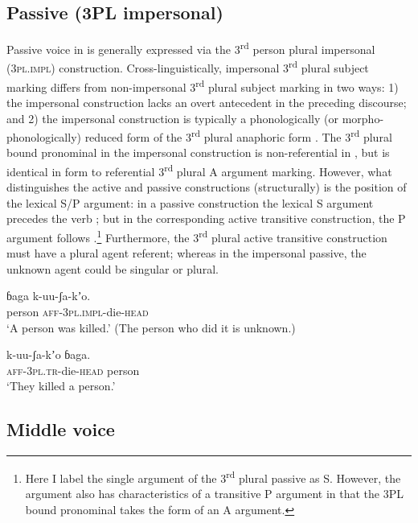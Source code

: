 \documentclass[output=paper]{langsci/langscibook}
\begin{document}
\subsection{Passive (3PL impersonal)}\label{sec:ahlandc:6.1}

Passive voice in  is generally expressed via the 3\textsuperscript{rd} person plural impersonal (\textsc{3pl.impl}) construction. Cross-linguistically, impersonal 3\textsuperscript{rd} plural subject marking differs from non-impersonal 3\textsuperscript{rd} plural subject marking in two ways: 1) the impersonal construction lacks an overt antecedent in the preceding discourse; and 2) the impersonal construction is typically a phonologically (or morpho-phonologically) reduced form of the 3\textsuperscript{rd} plural anaphoric form \citep[75]{Sieiwerska2010}. The 3\textsuperscript{rd} plural bound pronominal in the impersonal construction is non-referential in , but is identical in form to referential 3\textsuperscript{rd} plural A argument marking. However, what distinguishes the active and passive constructions (structurally) is the position of the lexical S/P argument: in a passive construction the lexical S argument precedes the verb ; but in the corresponding active transitive construction, the P argument follows .\footnote{Here I label the single argument of the 3\textsuperscript{rd} plural passive as S. However, the argument also has characteristics of a transitive P argument in that the 3PL bound pronominal takes the form of an A argument. } Furthermore, the 3\textsuperscript{rd} plural active transitive construction must have a plural agent referent; whereas in the impersonal passive, the unknown agent could be singular or plural.

\ea\label{ex:ahlandc:45}
\gll
ɓaga     k-uu-ʃa-kʼo.   \\
person   \textsc{aff}\textsc{{}-3pl.impl-}die\textsc{{}-head} \\
\glt
‘A person was killed.’ (The person who did it is unknown.)
\z

\ea\label{ex:ahlandc:46}
\gll
k-uu-ʃa-kʼo     ɓaga.  \\
\textsc{aff}\textsc{{}-3pl.tr-}die\textsc{{}-head   } person \\
\glt
‘They killed a person.’
\z

\subsection{Middle voice}\label{sec:ahlandc:6.2}
\end{document}
